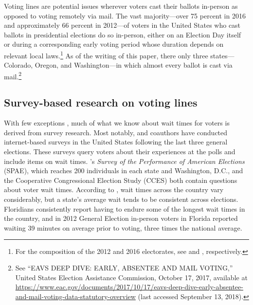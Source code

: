 \documentclass[12pt,titlepage]{article}
\begin{document}
Voting lines are potential issues wherever voters cast their ballots
in-person as opposed to voting remotely via mail.  The vast
majority---over 75 percent in 2016 and approximately 66 percent in
2012---of voters in the United States who cast ballots in presidential
elections do so in-person, either on an Election Day itself or during
a corresponding early voting period whose duration depends on relevant
local laws.\footnote{For the composition of the 2012 and 2016
  electorates, see \citet{eac:2012} and \citet{eac:2016},
  respectively.}  As of the writing of this paper, there only three
states---Colorado, Oregon, and Washington---in which almost every
ballot is cast via mail.\footnote{See ``EAVS DEEP DIVE: EARLY,
  ABSENTEE AND MAIL VOTING,'' United States Election Assistance
  Commission, October 17, 2017, available at
  \url{https://www.eac.gov/documents/2017/10/17/eavs-deep-dive-early-absentee-and-mail-voting-data-statutory-overview}
  (last accessed September 13, 2018).}


\subsection*{Survey-based research on voting lines}


With few exceptions \citep[e.g.,][]{spencermarkovits:renege,
  herronsmith:hanoverstudy, pettigrew:longlinesminorityprecincts},
much of what we know about wait times for voters is derived from
survey research. Most notably, \citet{stewart:waitingtovote2012} and
coauthors have conducted internet-based surveys in the United States
following the last three general elections. These surveys query voters
about their experiences at the polls and include items on wait times.
\citeauthor{stewart:waitingtovote2012}'s \emph{Survey of
  the Performance of American Elections} (SPAE), which reaches 200
individuals in each state and Washington, D.C., and the Cooperative
Congressional Election Study (CCES) both contain questions about voter
wait times. According to \citeauthor{stewart:waitingtovote2012}, wait
times across the country vary considerably, but a state's average wait
tends to be consistent across elections. Floridians consistently
report having to endure some of the longest wait times in the country,
and in 2012 General Election in-person voters in Florida reported
waiting 39 minutes on average prior to voting, three times the
national average.
\end{document}
